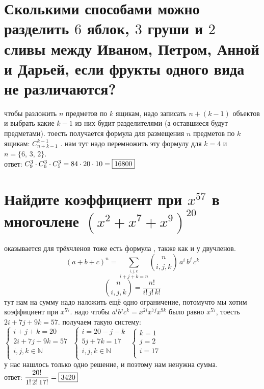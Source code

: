 \documentclass{article}
\newcommand{\ds}{\displaystyle}
\newcommand{\N}{\mathbb{N}}
\newcommand{\Cnk}[2]{C_{#1}^{#2}}
\renewcommand{\f}{\frac}
\begin{document}
  \section{Сколькими способами можно разделить $6$ яблок, $3$ груши и $2$ сливы между Иваном, Петром, Анной и Дарьей, если фрукты одного вида не различаются?}
  чтобы разложить $n$ предметов по $k$ ящикам,
  надо записать $n+(k-1)$ объектов и выбрать какие $k-1$ из них будит разделителями (а оставшиеся будут предметами).
  тоесть получается формула для размещения $n$ предметов по $k$ ящикам: $\Cnk{n+k-1}{k-1}$ \cite{box}.
  нам тут надо перемножить эту формулу для $k=4$ и $n=\{6,\, 3,\, 2\}$. \\
  ответ: $ \Cnk{9}{3} \cdot \Cnk{6}{3} \cdot \Cnk{5}{3} = 84 \cdot 20 \cdot 10 = \fbox{16800} $

  \section{Найдите коэффициент при $x^{57}$ в многочлене $(x^2 + x^7 + x^9)^{20}$}
  оказывается для трёхчленов тоже есть формула \cite{trinom}, также как и у двучленов.
  $$ (a+b+c)^n = \sum_{\stackrel{i,j,k}{i+j+k=n}}  {n \choose i,j,k}\, a^i \, b^j \, c^k $$
  $$ {n \choose i,j,k} = \frac{n!}{i!\,j!\,k!} $$
  тут нам на сумму надо наложить ещё одно ограничение, потомучто мы хотим коэффициент при $x^{57}$.
  надо чтобы $a^i b^j c^k = x^{2i} x^{7j} x^{9k}$ было равно $x^{57}$, тоесть $2i+7j+9k = 57$.
  получаем такую систему: \\
  $\ds \begin{cases}
    i+j+k = 20 \\
    2i+7j+9k = 57 \\
    i,j,k \in \N \\
  \end{cases}$ \hfill $\begin{cases}
    i = 20-j-k \\
    5j+7k = 17 \\
    i,j,k \in \N \\
  \end{cases}$ \hfill $\begin{cases}
    k = 1 \\
    j = 2 \\
    i = 17 \\
  \end{cases}$ \\
  у нас нашлось только одно решение, и поэтому нам ненужна сумма. \\
  ответ: $\ds \f{20!}{1!\,2!\,17!} = \fbox{3420}$
\end{document}
